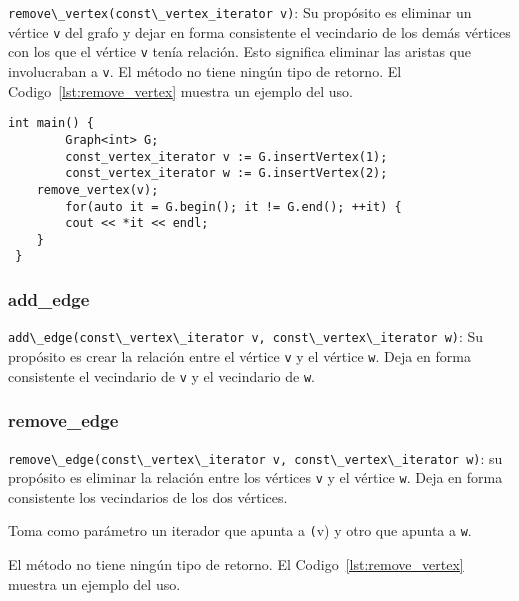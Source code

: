 \documentclass[%
    a4paper,%
    12pt,%
    twoside,%
    openright,%
    halfparskip,%
    cleardoubleempty,%
    bigheadings,%
    titlepage,%
    headsepline%
]{scrbook}
\makeatletter
\newcommand{\Code}[1]{\lstinline[basicstyle={\tt}]@#1@}
\makeatother
\begin{document}
\Code{remove\_vertex(const\_vertex_iterator v)}: Su propósito es eliminar un vértice \Code{v} del grafo y dejar en forma consistente el vecindario de los demás vértices con los que el vértice \Code{v} tenía relación. Esto significa eliminar las aristas que involucraban a \Code{v}.
El método no tiene ningún tipo de retorno. El Codigo~\ref{lst:remove_vertex} muestra un ejemplo del uso.

\begin{lstlisting}[caption={Ejemplo de uso de remove\_vertex. Reescribimos el pseudocódigo ~\ref{lst:pseudo:remove_vertex} a c++. El código crea un grafo $G$ con dos vértices, el primero \texttt{v} representa al vértice $v$ con el número 1 y el segundo \texttt{w} representa al vértice $w$ con el número 2 como infomación. Luego, remueve \texttt{v} del grafo y el ciclo imprime ``2'' como resultado. Ver Sección~\ref{sec:vertex iterator} para más información de \texttt{vertex\_iterator}.},gobble=2,float=ht,label={lst:remove_vertex},emph={remove_vertex}]
  int main() {
        Graph<int> G;
        const_vertex_iterator v := G.insertVertex(1);
        const_vertex_iterator w := G.insertVertex(2);
    remove_vertex(v);
        for(auto it = G.begin(); it != G.end(); ++it) {
        cout << *it << endl;
    }
 }
\end{lstlisting}



\subsubsection{add\_edge}
\label{sec:add-edge}
\Code{add\_edge(const\_vertex\_iterator v, const\_vertex\_iterator w)}: Su propósito es crear la relación entre el vértice \Code{v} y el vértice \Code{w}. Deja en forma consistente el vecindario de \Code{v} y el vecindario de \Code{w}.

\subsubsection{remove\_edge}
\label{sec:remove-edge}
\Code{remove\_edge(const\_vertex\_iterator v, const\_vertex\_iterator w)}: su propósito es eliminar la relación entre los vértices \Code{v} y el vértice \Code{w}. Deja en forma consistente los vecindarios de los dos vértices.

Toma como parámetro un iterador que apunta a \Code(v) y otro que apunta a \Code{w}.

El método no tiene ningún tipo de retorno. El Codigo~\ref{lst:remove_vertex} muestra un ejemplo del uso.
\end{document}
